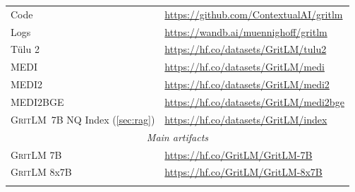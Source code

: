 \documentclass{article}
\newcommand{\model}{\textsc{GritLM}}
\newcommand{\modelbase}{\textsc{GritLM~7B}}
\newcommand{\tulu}{T\"ulu}
\begin{document}
\begin{longtable}{p{2.9cm} p{10.2cm}}
\midrule
Code & \url{https://github.com/ContextualAI/gritlm} \\
Logs & \url{https://wandb.ai/muennighoff/gritlm} \\
\tulu{} 2 & \url{https://hf.co/datasets/GritLM/tulu2} \\
MEDI & \url{https://hf.co/datasets/GritLM/medi} \\
MEDI2 & \url{https://hf.co/datasets/GritLM/medi2} \\
MEDI2BGE & \url{https://hf.co/datasets/GritLM/medi2bge} \\    
\modelbase{} NQ Index (\autoref{sec:rag}) & \url{https://hf.co/datasets/GritLM/index} \\
\midrule
\multicolumn{2}{c}{\textit{Main artifacts}} \\
\midrule
\model{} 7B & \url{https://hf.co/GritLM/GritLM-7B} \\
\model{} 8x7B & \url{https://hf.co/GritLM/GritLM-8x7B} \\    
\bottomrule
\label{tab:artifacts}
\end{longtable}
\end{document}
